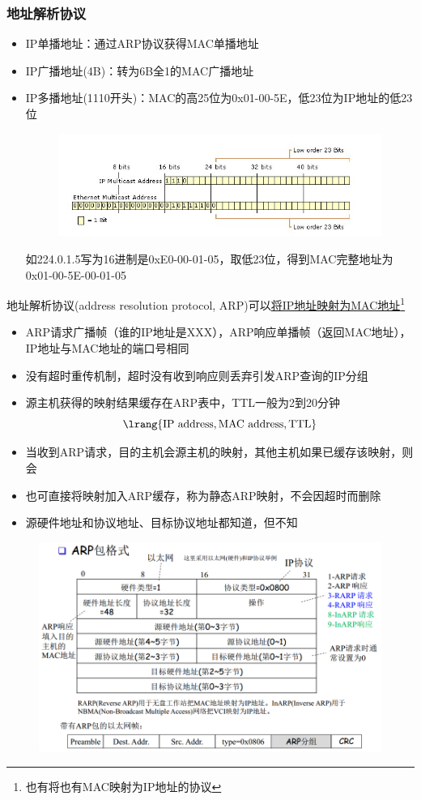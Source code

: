 \subsubsection{地址解析协议}
\begin{itemize}
	\item IP单播地址：通过ARP协议获得MAC单播地址
	\item IP广播地址(4B)：转为6B全1的MAC广播地址
	\item IP多播地址(1110开头)：MAC的高25位为0x01-00-5E，低23位为IP地址的低23位
	\begin{figure}[H]
		\centering
		\includegraphics[width=0.8\linewidth]{fig/ip_mac.png}
	\end{figure}
	如224.0.1.5写为16进制是0xE0-00-01-05，取低23位，得到MAC完整地址为0x01-00-5E-00-01-05
\end{itemize}

地址解析协议(address resolution protocol, ARP)可以\underline{将IP地址映射为MAC地址}\footnote{也有将也有MAC映射为IP地址的协议}
\begin{itemize}
	\item ARP请求广播帧（谁的IP地址是XXX），ARP响应单播帧（返回MAC地址），IP地址与MAC地址的端口号相同
	\item 没有超时重传机制，超时没有收到响应则丢弃引发ARP查询的IP分组
	\item 源主机获得的映射结果缓存在ARP表中，TTL一般为2到20分钟
	\[\lrang{\text{IP address},\text{MAC address},\text{TTL}}\]
	\item 当收到ARP请求，目的主机会源主机的映射，其他主机如果已缓存该映射，则会
	\item 也可直接将映射加入ARP缓存，称为静态ARP映射，不会因超时而删除
	\item 源硬件地址和协议地址、目标协议地址都知道，但不知
\end{itemize}
\begin{figure}[H]
	\centering
	\includegraphics[width=0.7\linewidth]{fig/ARP.PNG}
\end{figure}


